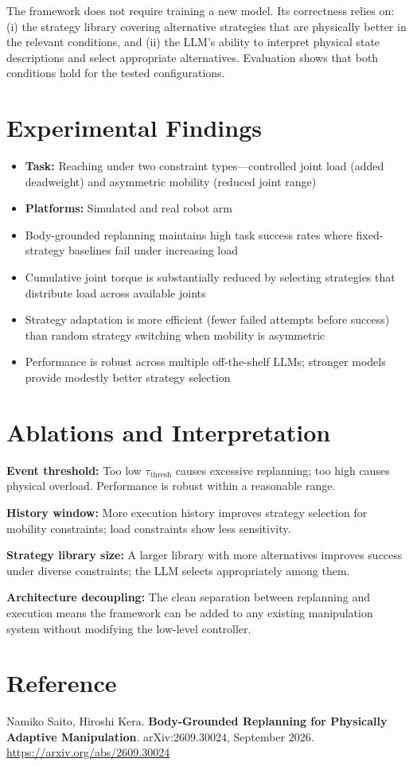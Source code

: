 \documentclass[10pt,twocolumn]{article}
\begin{document}
The framework does not require training a new model. Its correctness relies
on: (i) the strategy library covering alternative strategies that are
physically better in the relevant conditions, and (ii) the LLM's ability to
interpret physical state descriptions and select appropriate alternatives.
Evaluation shows that both conditions hold for the tested configurations.

\section{Experimental Findings}

\begin{itemize}[itemsep=2pt,parsep=0pt]
  \item \textbf{Task:} Reaching under two constraint types---controlled
    joint load (added deadweight) and asymmetric mobility (reduced joint range)
  \item \textbf{Platforms:} Simulated and real robot arm
  \item Body-grounded replanning maintains high task success rates where
    fixed-strategy baselines fail under increasing load
  \item Cumulative joint torque is substantially reduced by selecting
    strategies that distribute load across available joints
  \item Strategy adaptation is more efficient (fewer failed attempts before
    success) than random strategy switching when mobility is asymmetric
  \item Performance is robust across multiple off-the-shelf LLMs; stronger
    models provide modestly better strategy selection
\end{itemize}

\section{Ablations and Interpretation}

\textbf{Event threshold:} Too low $\tau_\text{thresh}$ causes excessive
replanning; too high causes physical overload. Performance is robust within
a reasonable range.

\textbf{History window:} More execution history improves strategy selection
for mobility constraints; load constraints show less sensitivity.

\textbf{Strategy library size:} A larger library with more alternatives
improves success under diverse constraints; the LLM selects appropriately
among them.

\textbf{Architecture decoupling:} The clean separation between replanning and
execution means the framework can be added to any existing manipulation
system without modifying the low-level controller.

\section*{Reference}

Namiko Saito, Hiroshi Kera.
\textbf{Body-Grounded Replanning for Physically Adaptive Manipulation}.
arXiv:2609.30024, September 2026.\\
\url{https://arxiv.org/abs/2609.30024}
\end{document}
